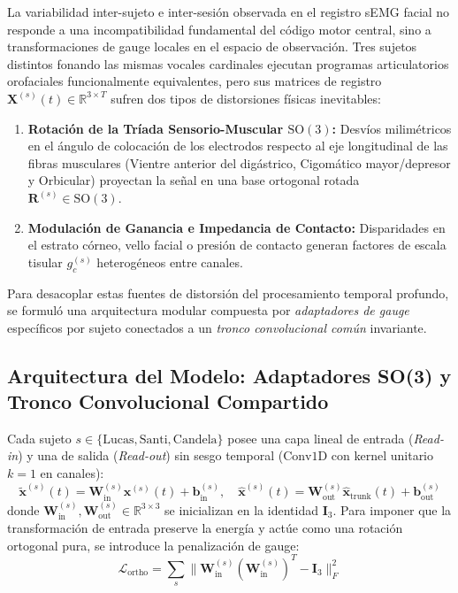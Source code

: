 \documentclass[11pt,a4paper,openany]{book}
\theoremstyle{definition}
\begin{document}
La variabilidad inter-sujeto e inter-sesión observada en el registro sEMG facial no responde a una incompatibilidad fundamental del código motor central, sino a transformaciones de gauge locales en el espacio de observación. Tres sujetos distintos fonando las mismas vocales cardinales ejecutan programas articulatorios orofaciales funcionalmente equivalentes, pero sus matrices de registro $\mathbf{X}^{(s)}(t) \in \mathbb{R}^{3 \times T}$ sufren dos tipos de distorsiones físicas inevitables:
\begin{enumerate}
    \item \textbf{Rotación de la Tríada Sensorio-Muscular $\text{SO}(3)$:} Desvíos milimétricos en el ángulo de colocación de los electrodos respecto al eje longitudinal de las fibras musculares (Vientre anterior del digástrico, Cigomático mayor/depresor y Orbicular) proyectan la señal en una base ortogonal rotada $\mathbf{R}^{(s)} \in \text{SO}(3)$.
    \item \textbf{Modulación de Ganancia e Impedancia de Contacto:} Disparidades en el estrato córneo, vello facial o presión de contacto generan factores de escala tisular $g_c^{(s)}$ heterogéneos entre canales.
\end{enumerate}

Para desacoplar estas fuentes de distorsión del procesamiento temporal profundo, se formuló una arquitectura modular compuesta por \textit{adaptadores de gauge} específicos por sujeto conectados a un \textit{tronco convolucional común} invariante.

\subsection{Arquitectura del Modelo: Adaptadores SO(3) y Tronco Convolucional Compartido}
\label{subsec:arquitectura_gauge_tronco}

Cada sujeto $s \in \{\text{Lucas}, \text{Santi}, \text{Candela}\}$ posee una capa lineal de entrada (\textit{Read-in}) y una de salida (\textit{Read-out}) sin sesgo temporal ($\text{Conv1D}$ con kernel unitario $k=1$ en canales):
\begin{equation}
    \tilde{\mathbf{x}}^{(s)}(t) = \mathbf{W}_{\text{in}}^{(s)} \mathbf{x}^{(s)}(t) + \mathbf{b}_{\text{in}}^{(s)}, \quad \hat{\mathbf{x}}^{(s)}(t) = \mathbf{W}_{\text{out}}^{(s)} \hat{\mathbf{x}}_{\text{trunk}}(t) + \mathbf{b}_{\text{out}}^{(s)}
\end{equation}
donde $\mathbf{W}_{\text{in}}^{(s)}, \mathbf{W}_{\text{out}}^{(s)} \in \mathbb{R}^{3 \times 3}$ se inicializan en la identidad $\mathbf{I}_3$. Para imponer que la transformación de entrada preserve la energía y actúe como una rotación ortogonal pura, se introduce la penalización de gauge:
\begin{equation}
    \mathcal{L}_{\text{ortho}} = \sum_{s} \|\mathbf{W}_{\text{in}}^{(s)} (\mathbf{W}_{\text{in}}^{(s)})^T - \mathbf{I}_3\|_F^2
\end{equation}
\end{document}
